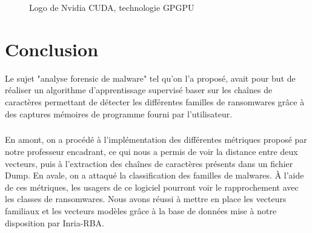 \documentclass[a4paper, 12pt]{book}
\begin{document}
\begin{figure}[!h] 	
    \caption{Logo de Nvidia CUDA, technologie GPGPU}
\end{figure}


\chapter*{Conclusion}
Le sujet "analyse forensic de malware" tel qu'on l'a proposé, avait pour but de réaliser un algorithme d'apprentissage supervisé baser sur les chaînes de caractères permettant de détecter les différentes familles de ransomwares grâce à des captures mémoires de programme fourni par l'utilisateur.
\paragraph{}
En amont, on a procédé à l'implémentation des différentes métriques proposé par notre professeur encadrant, ce qui nous a permis de voir la distance entre deux vecteurs, puis à l'extraction des chaînes de caractères présents dans un fichier Dump. En avale, on a attaqué la classification des familles de malwares.
\newline
\`{A} l'aide de ces métriques, les usagers de ce logiciel pourront voir le rapprochement avec les classes de ransomwares. Nous avons réussi à mettre en place les vecteurs familiaux et les vecteurs modèles grâce à la base de données mise à notre disposition par Inria-RBA.
\end{document}
